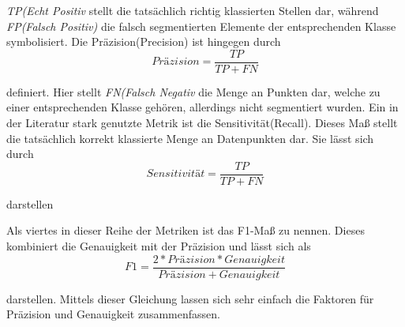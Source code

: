 \textit{TP(Echt Positiv}  stellt die tatsächlich richtig klassierten Stellen dar, während \textit{FP(Falsch Positiv)} die falsch segmentierten Elemente der entsprechenden Klasse symbolisiert. 
Die Präzision(Precision) ist hingegen durch
\begin{equation}
Präzision = \frac{TP}{TP+FN}    
\end{equation}
 
definiert. Hier stellt \textit{FN(Falsch Negativ} die Menge an Punkten dar, welche zu einer entsprechenden Klasse gehören, allerdings nicht segmentiert wurden. 
Ein in der Literatur stark genutzte Metrik ist die Sensitivität(Recall). Dieses Maß stellt die tatsächlich korrekt klassierte Menge an Datenpunkten dar. 
Sie lässt sich durch
\begin{equation}
Sensitivität = \frac{TP}{TP+FN}    
\end{equation}

darstellen

Als viertes in dieser Reihe der Metriken ist das F1-Maß zu nennen. Dieses kombiniert die Genauigkeit mit der Präzision und lässt sich als 
\begin{equation}
 F1 = \frac{2* Präzision * Genauigkeit}{Präzision + Genauigkeit}    
\end{equation}

darstellen. Mittels dieser Gleichung lassen sich sehr einfach die Faktoren für Präzision und Genauigkeit zusammenfassen.






